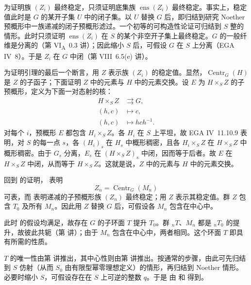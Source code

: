为证明族 \((Z_i)\) 最终稳定，只须证明底集族 \(\operatorname{ens}(Z_i)\) 最终稳定。事实上，稳定值此时是 \(G\) 的某开子集 \(U\) 中的闭子集。以 \(U\) 替换 \(G\) 后，即归结到研究 Noether 预概形中一族递减的闭子预概形滤过。一个初等的可构造性论证可归结到 \(S\) 整的情形。此时只须证明 \(\operatorname{ens}(Z_i)\) 在 \(S\) 的某个非空开子集上最终稳定。\(G\) 的一般纤维是分离的（第 VI\textsubscript{A}~0.3 讲）；因此缩小 \(S\) 后，可假设 \(G\) 在 \(S\) 上分离（EGA IV~8）。于是 \(Z_i\) 在 \(G\) 中闭（第 VIII~6.5(e) 讲）。

为证明引理的最后一个断言，用 \(Z\) 表示族 \((Z_i)\) 的稳定值。显然，\(\operatorname{Centr}_G(H)\) 是 \(Z\) 的子函子；下面证明 \(Z\) 中的元素与 \(H\) 中的元素交换。设 \(E\) 为 \(H\times_S Z\) 的子预概形，定义为下面一对态射的核：
\[
\begin{aligned}
  H\times_S Z&\rightrightarrows G,\\
  (h,c)&\longmapsto c,\\
  (h,c)&\longmapsto hch^{-1}.
\end{aligned}
\]
对每个 \(i\)，预概形 \(E\) 都包含 \(H_i\times_S Z\)。各 \(H_i\) 在 \(S\) 上平坦，故 EGA IV~11.10.9 表明，对 \(S\) 的每一点 \(s\)，各 \((H_i)_s\) 在 \(H_s\) 中概形稠密，且各 \(H_i\times_S Z\) 在 \(H\times_S Z\) 中概形稠密。由于 \(G_s\) 分离，\(E_s\) 在 \((H\times_S Z)_s\) 中闭，因而等于后者。故 \(E\) 在 \(H\times_S Z\) 中闭，从而等于 \(H\times_S Z\)。这就是说，\(Z\) 中的元素与 \(H\) 中的元素交换。

回到  的证明， 表明
\[
  Z_n=\operatorname{Centr}_G(M_n)
\]
可表，而 表明递减的子预概形族 \((Z_n)\) 最终稳定；用 \(Z\) 表示其稳定值。群 \(Z\) 包含 \(T_0\) 及所有 \(M_n\)。因此用 \(Z\) 替换 \(G\) 后，可假设各 \(M_n\) 包含在中心中。

此时 的假设均满足，故存在 \(G\) 的子环面 \(T\) 提升 \(T_0\)。群 \({}_nT\)、\(M_n\) 都是 \({}_nT_0\) 的提升，故彼此共轭（第  讲）；由于 \(M_n\) 包含在中心中，两者相同。这个环面 \(T\) 即具有所需的性质。

\(T\) 的唯一性由第  讲推出，其中心性则由第  讲推出。按通常的步骤，由此可先归结到 \(S\) 仿射（从而 \(S_0\) 由有限型幂零理想定义）的情形，再归结到 Noether 情形。必要时缩小 \(S\)，可假设存在在 \(S\) 上可逆的整数 \(q\)。于是 由  和  得到。

